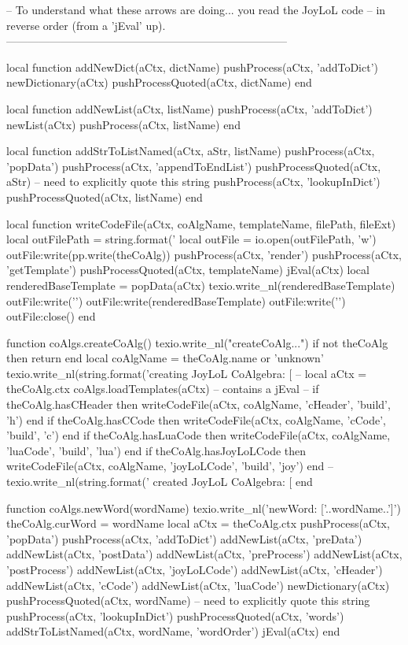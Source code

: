 -- To understand what these arrows are doing... you read the JoyLoL code 
-- in reverse order (from a 'jEval' up). 
-----------------------------------------------------------------------------

local function addNewDict(aCtx, dictName)
  pushProcess(aCtx, 'addToDict')
  newDictionary(aCtx)
  pushProcessQuoted(aCtx, dictName)
end

local function addNewList(aCtx, listName)
  pushProcess(aCtx, 'addToDict')
  newList(aCtx)
  pushProcess(aCtx, listName)
end

local function addStrToListNamed(aCtx, aStr, listName)
  pushProcess(aCtx, 'popData')
  pushProcess(aCtx, 'appendToEndList')
  pushProcessQuoted(aCtx, aStr) -- need to explicitly quote this string
  pushProcess(aCtx, 'lookupInDict')
  pushProcessQuoted(aCtx, listName)
end

local function writeCodeFile(aCtx, coAlgName, templateName, filePath, fileExt)
  local outFilePath = string.format('%
  local outFile = io.open(outFilePath, 'w')
  outFile:write(pp.write(theCoAlg))
  pushProcess(aCtx, 'render')
  pushProcess(aCtx, 'getTemplate')
  pushProcessQuoted(aCtx, templateName)
  jEval(aCtx)
  local renderedBaseTemplate = popData(aCtx)
  texio.write_nl(renderedBaseTemplate)
  outFile:write('\n')
  outFile:write(renderedBaseTemplate)
  outFile:write('\n')
  outFile:close()
end

function coAlgs.createCoAlg()
  texio.write_nl("createCoAlg...")
  if not theCoAlg then return end
  local coAlgName = theCoAlg.name or 'unknown'
  texio.write_nl(string.format('creating JoyLoL CoAlgebra: [%
  --
  local aCtx = theCoAlg.ctx
  coAlgs.loadTemplates(aCtx) -- contains a jEval
  --
  if theCoAlg.hasCHeader    then writeCodeFile(aCtx, coAlgName, 'cHeader',    'build', 'h')   end
  if theCoAlg.hasCCode      then writeCodeFile(aCtx, coAlgName, 'cCode',      'build', 'c')   end
  if theCoAlg.hasLuaCode    then writeCodeFile(aCtx, coAlgName, 'luaCode',    'build', 'lua') end
  if theCoAlg.hasJoyLoLCode then writeCodeFile(aCtx, coAlgName, 'joyLoLCode', 'build', 'joy') end
  --
  texio.write_nl(string.format(' created JoyLoL CoAlgebra: [%
end

function coAlgs.newWord(wordName)
  texio.write_nl('newWord: ['..wordName..']')
  theCoAlg.curWord    = wordName
  local aCtx = theCoAlg.ctx
  pushProcess(aCtx, 'popData')
  pushProcess(aCtx, 'addToDict')
  addNewList(aCtx, 'preData')
  addNewList(aCtx, 'postData')
  addNewList(aCtx, 'preProcess')
  addNewList(aCtx, 'postProcess')
  addNewList(aCtx, 'joyLoLCode')
  addNewList(aCtx, 'cHeader')
  addNewList(aCtx, 'cCode')
  addNewList(aCtx, 'luaCode')
  newDictionary(aCtx)
  pushProcessQuoted(aCtx, wordName) -- need to explicitly quote this string
  pushProcess(aCtx, 'lookupInDict')
  pushProcessQuoted(aCtx, 'words')
  addStrToListNamed(aCtx, wordName, 'wordOrder')
  jEval(aCtx)
end

